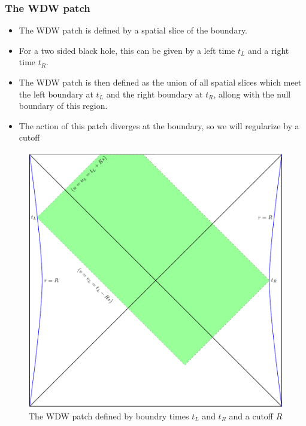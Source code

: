 \documentclass[8pt,aspectratio=169]{beamer}
\begin{document}
\begin{frame}
\frametitle{The WDW patch}

\begin{minipage}[t]{0.55\linewidth}

\begin{itemize}

\item The WDW patch is defined by a spatial slice of the boundary. 

\item For a two sided black hole, this can be given by a left time $t_L$ and a right time $t_R$.

\item The WDW patch is then defined as the union of all spatial slices which meet the left boundary at $t_L$ and the right boundary at $t_R$, allong with the null boundary of this region.

\item The action of this patch diverges at the boundary, so we will regularize by a cutoff

\end{itemize}

\end{minipage}\hfill
%
\begin{minipage}[t]{0.44\linewidth}

\begin{figure}
    \begin{center}
    
        \includegraphics[scale=0.4]{WDW2.pdf}    
    
    \end{center}
    \caption{The WDW patch defined by boundry times $t_L$ and $t_R$ and a cutoff $R$}
    \label{fig:WDW2}
\end{figure}

\end{minipage}

\end{frame}
\end{document}
